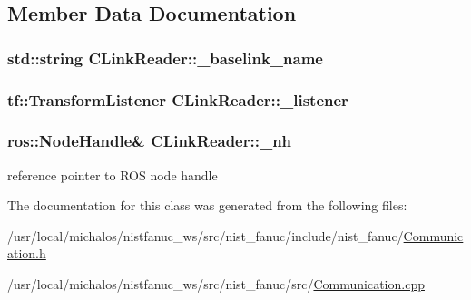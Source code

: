 \subsection{Member Data Documentation}
\hypertarget{classCLinkReader_a896e3d57e157c3bb5fdf630fbb87575d}{
\subsubsection[{\-\_\-baselink\-\_\-name}]{\setlength{\rightskip}{0pt plus 5cm}std\-::string C\-Link\-Reader\-::\-\_\-baselink\-\_\-name}}\label{classCLinkReader_a896e3d57e157c3bb5fdf630fbb87575d}
\hypertarget{classCLinkReader_a86de58d6199f63fd823067616398a7cf}{
\subsubsection[{\-\_\-listener}]{\setlength{\rightskip}{0pt plus 5cm}tf\-::\-Transform\-Listener C\-Link\-Reader\-::\-\_\-listener}}\label{classCLinkReader_a86de58d6199f63fd823067616398a7cf}
\hypertarget{classCLinkReader_acead51b4129575aefacafca5e7c81b36}{
\subsubsection[{\-\_\-nh}]{\setlength{\rightskip}{0pt plus 5cm}ros\-::\-Node\-Handle\& C\-Link\-Reader\-::\-\_\-nh}}\label{classCLinkReader_acead51b4129575aefacafca5e7c81b36}
reference pointer to R\-O\-S node handle 

The documentation for this class was generated from the following files\-:\begin{DoxyCompactItemize}
\item 
/usr/local/michalos/nistfanuc\-\_\-ws/src/nist\-\_\-fanuc/include/nist\-\_\-fanuc/\hyperlink{Communication_8h}{Communication.\-h}\item 
/usr/local/michalos/nistfanuc\-\_\-ws/src/nist\-\_\-fanuc/src/\hyperlink{Communication_8cpp}{Communication.\-cpp}\end{DoxyCompactItemize}
